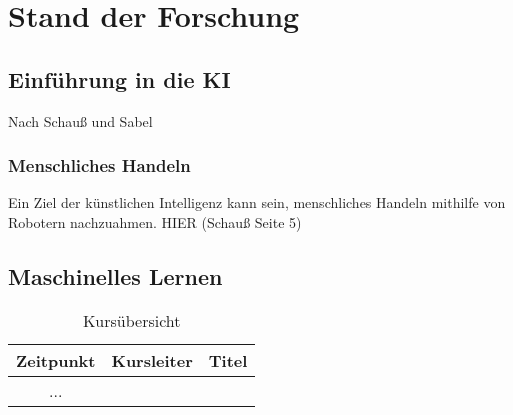 \chapter{Stand der Forschung}
\section{Einführung in die KI}
Nach Schauß und Sabel
\subsection{Menschliches Handeln}
Ein Ziel der künstlichen Intelligenz kann sein, menschliches Handeln mithilfe von Robotern nachzuahmen. HIER (Schauß Seite 5) 

\section{Maschinelles Lernen}

\begin{table}
\caption{ Kursübersicht}
\begin{tabular}{|c|c|c|}
\hline
Zeitpunkt & Kursleiter & Titel \\
\hline 
 ...   
\end{tabular}
\end{table}